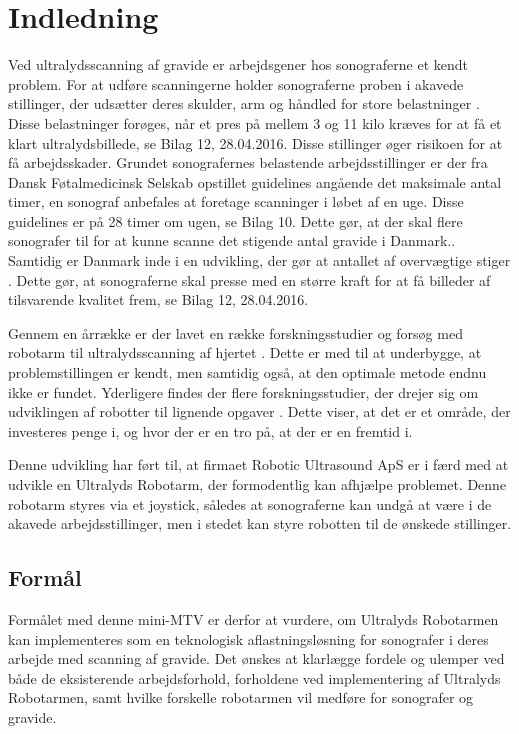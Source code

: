 \chapter{Indledning} 
Ved ultralydsscanning af gravide er arbejdsgener hos sonograferne et kendt problem. For at udføre scanningerne holder sonograferne proben i akavede stillinger, der udsætter deres skulder, arm og håndled for store belastninger \cite{31}\cite{24}\cite{36}\cite{32}. Disse belastninger forøges, når et pres på mellem 3 og 11 kilo kræves for at få et klart ultralydsbillede, se Bilag 12, 28.04.2016. Disse stillinger øger risikoen for at få arbejdsskader. Grundet sonografernes belastende arbejdsstillinger er der fra Dansk Føtalmedicinsk Selskab opstillet guidelines angående det maksimale antal timer, en sonograf anbefales at foretage scanninger i løbet af en uge. Disse guidelines er på 28 timer om ugen, se Bilag 10. Dette gør, at der skal flere sonografer til for at kunne scanne det stigende antal gravide i Danmark.\cite{Foedsler}. \\
Samtidig er Danmark inde i en udvikling, der gør at antallet af overvægtige stiger \cite{Overvaegt}. Dette gør, at sonograferne skal presse med en større kraft for at få billeder af tilsvarende kvalitet frem, se Bilag 12, 28.04.2016. 

Gennem en årrække er der lavet en række forskningsstudier og forsøg med robotarm til ultralydsscanning af hjertet \cite{8}. Dette er med til at underbygge, at problemstillingen er kendt, men samtidig også, at den optimale metode endnu ikke er fundet. Yderligere findes der flere forskningsstudier, der drejer sig om udviklingen af robotter til lignende opgaver \cite{18}\cite{8}. Dette viser, at det er et område, der investeres penge i, og hvor der er en tro på, at der er en fremtid i. 

Denne udvikling har ført til, at firmaet Robotic Ultrasound ApS er i færd med at udvikle en Ultralyds Robotarm, der formodentlig kan afhjælpe problemet. Denne robotarm styres via et joystick, således at sonograferne kan undgå at være i de akavede arbejdsstillinger, men i stedet kan styre robotten til de ønskede stillinger. 


\section{Formål}
Formålet med denne mini-MTV er derfor at vurdere, om Ultralyds Robotarmen kan implementeres som en teknologisk aflastningsløsning for sonografer i deres arbejde med scanning af gravide. Det ønskes at klarlægge fordele og ulemper ved både de eksisterende arbejdsforhold, forholdene ved implementering af Ultralyds Robotarmen, samt hvilke forskelle robotarmen vil medføre for sonografer og gravide.

